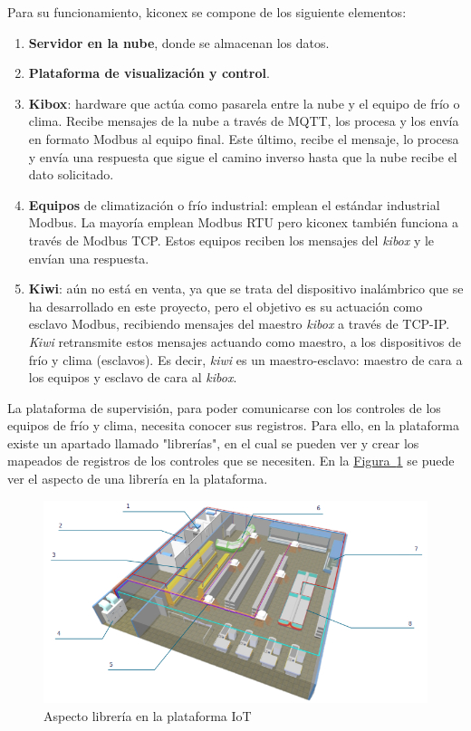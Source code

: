 Para su funcionamiento, kiconex se compone de los siguiente elementos:
\begin{enumerate}
  \item \textbf{Servidor en la nube}, donde se almacenan los datos.
  \item \textbf{Plataforma de visualización y control}.  
  \item \textbf{Kibox}: hardware que actúa como pasarela entre la nube y el equipo de frío o clima. Recibe mensajes de la nube a través de MQTT, los procesa y los envía en formato Modbus al equipo final. Este último, recibe el mensaje, lo procesa y envía una respuesta que sigue el camino inverso hasta que la nube recibe el dato solicitado. 
  \item \textbf{Equipos} de climatización o frío industrial: emplean el estándar industrial Modbus. La mayoría emplean Modbus RTU pero kiconex también funciona a través de Modbus TCP. Estos equipos reciben los mensajes del \textit{kibox} y le envían una respuesta.
  \item \textbf{Kiwi}: aún no está en venta, ya que se trata del dispositivo inalámbrico que se ha desarrollado en este proyecto, pero el objetivo es su actuación como esclavo Modbus, recibiendo mensajes del maestro \textit{kibox} a través de TCP-IP. \textit{Kiwi} retransmite estos mensajes actuando como maestro, a los dispositivos de frío y clima (esclavos). Es decir, \textit{kiwi} es un maestro-esclavo: maestro de cara a los equipos y esclavo de cara al \textit{kibox}.
\end{enumerate}



La plataforma de supervisión, para poder comunicarse con los controles de los equipos de frío y clima, necesita conocer sus registros. Para ello, en la plataforma existe un apartado llamado "librerías", en el cual se pueden ver y crear los mapeados de registros de los controles que se necesiten. En la \hyperref[figura:libreriaPlataforma]{Figura~\ref{figura:libreriaPlataforma}} se puede ver el aspecto de una librería en la plataforma.

\begin{figure}[h]
  \centering
  \includegraphics[width=\textwidth, keepaspectratio]{img/planoSupermercado}
  \caption{Aspecto librería en la plataforma IoT}
  \label{figura:libreriaPlataforma}
\end{figure}

